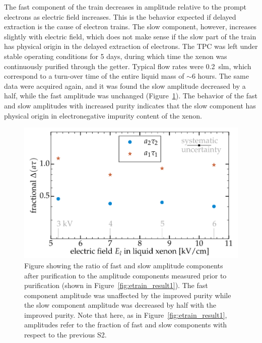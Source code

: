The fast component of the train decreases in amplitude relative to the prompt electrons as electric field increases. This is the behavior expected if delayed extraction is the cause of electron trains. The slow component, however, increases slightly with electric field, which does not make sense if the slow part of the train has physical origin in the delayed extraction of electrons. The \ac{TPC} was left under stable operating conditions for 5 days, during which time the xenon was continuously purified through the getter. Typical flow rates were 0.2~slm, which correspond to a turn-over time of the entire liquid mass of $\sim$6 hours. The same data were acquired again, and it was found the slow amplitude decreased by a half, while the fast amplitude was unchanged (Figure~\ref{fig:etrain_result2}). The behavior of the fast and slow amplitudes with increased purity indicates that the slow component has physical origin in electronegative impurity content of the xenon.

\begin{figure}[htbp]
\begin{center}
\includegraphics[width=\textwidth]{figures/etrains/etrain_result2.png}
\caption{Figure showing the ratio of fast and slow amplitude components after purification to the amplitude components measured prior to purification (shown in Figure~\ref{fig:etrain_result1}). The fast component amplitude was unaffected by the improved purity while the slow component amplitude was decreased by half with the improved purity. Note that here, as in Figure~\ref{fig:etrain_result1}, amplitudes refer to the fraction of fast and slow components with respect to the previous S2. }
\label{fig:etrain_result2}
\end{center}
\end{figure}

